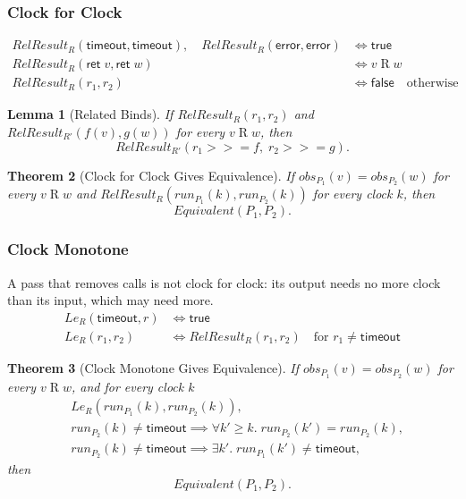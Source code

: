 \documentclass[10pt]{article}
\theoremstyle{acmplain}
\newtheorem{theorem}{Theorem}[section]
\newtheorem{lemma}[theorem]{Lemma}
\newcommand{\key}[1]{\mathsf{#1}}
\newcommand{\error}{\key{error}}
\newcommand{\obs}{\mathit{obs}}
\newcommand{\Equiv}{\mathit{Equivalent}}
\newcommand{\tmo}{\key{timeout}}
\newcommand{\Ret}{\key{ret}\;}
\newcommand{\bind}{\mathbin{>\!\!>\!\!=}}
\newcommand{\run}{\mathit{run}}
\newcommand{\RelRes}[1]{\mathit{RelResult}_{#1}}
\begin{document}
\subsubsection{Clock for Clock}

\begin{align*}
  \RelRes{R}(\tmo, \tmo), \quad \RelRes{R}(\error, \error) &\iff \mathsf{true} \\
  \RelRes{R}(\Ret v, \Ret w) &\iff v \mathrel{R} w \\
  \RelRes{R}(r_1, r_2) &\iff \mathsf{false} \quad \text{otherwise}
\end{align*}

\begin{lemma}[Related Binds]\label{lem:bind-rel}
If $\RelRes{R}(r_1, r_2)$ and $\RelRes{R'}(f(v), g(w))$ for every $v \mathrel{R} w$, then
\[
  \RelRes{R'}(r_1 \bind f,\; r_2 \bind g) .
\]
\end{lemma}

\begin{theorem}[Clock for Clock Gives Equivalence]\label{thm:clocked}
If $\obs_{P_1}(v) = \obs_{P_2}(w)$ for every $v \mathrel{R} w$ and
$\RelRes{R}(\run_{P_1}(k), \run_{P_2}(k))$ for every clock $k$, then
\[
  \Equiv(P_1, P_2) .
\]
\end{theorem}

\subsubsection{Clock Monotone}

A pass that removes calls is not clock for clock: its output needs no more
clock than its input, which may need more.
\begin{align*}
  \mathit{Le}_R(\tmo, r) &\iff \mathsf{true} \\
  \mathit{Le}_R(r_1, r_2) &\iff \RelRes{R}(r_1, r_2) \quad \text{for } r_1 \neq \tmo
\end{align*}

\begin{theorem}[Clock Monotone Gives Equivalence]\label{thm:clocked-le}
If $\obs_{P_1}(v) = \obs_{P_2}(w)$ for every $v \mathrel{R} w$, and for every clock $k$
\begin{align*}
  &\mathit{Le}_R(\run_{P_1}(k), \run_{P_2}(k)) , \\
  &\run_{P_2}(k) \neq \tmo \implies \forall k' \geq k.\; \run_{P_2}(k') = \run_{P_2}(k) , \\
  &\run_{P_2}(k) \neq \tmo \implies \exists k'.\; \run_{P_1}(k') \neq \tmo ,
\end{align*}
then
\[
  \Equiv(P_1, P_2) .
\]
\end{theorem}
\end{document}
